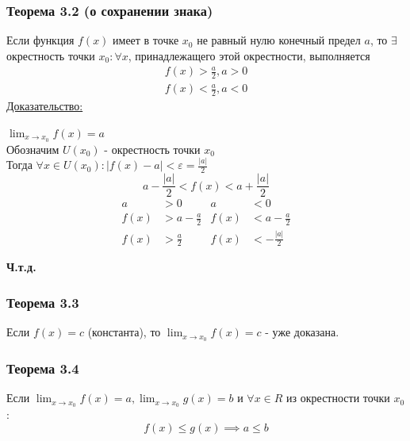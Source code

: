 \documentclass[12pt]{article}
\begin{document}
    \subsubsection*{Теорема 3.2 (о сохранении знака)}
    Если функция $f(x)$ имеет в точке $x_0$ не равный нулю конечный предел $a$, то $\exists$ окрестность точки $x_0 : \forall x$, принадлежащего этой окрестности, выполняется
    \begin{gather*}
        f(x) > \frac{a}{2}, a > 0\\
        f(x) < \frac{a}{2}, a < 0
    \end{gather*}
    \underline{Доказательство:}
    \begin{adjustwidth}{1.5em}{1.5em}
        $\lim_{x\to x_0}f(x) = a$\\
        Обозначим $U(x_0)$ - окрестность точки $x_0$\\
        Тогда $\forall x \in U(x_0) : |f(x) - a| < \varepsilon = \frac{|a|}{2}$
        \[a - \frac{|a|}{2} < f(x) < a + \frac{|a|}{2}\]
        \begin{align*}
            a &> 0 & a &< 0\\
            f(x) &> a - \frac{a}{2} & f(x) &< a - \frac{a}{2}\\
            f(x) &> \frac{a}{2} & f(x) &< -\frac{|a|}{2}
        \end{align*}
        \begin{center}
            \textbf{Ч.т.д.}
        \end{center}
    \end{adjustwidth}

    \subsubsection*{Теорема 3.3}
    Если $f(x) = c$ (константа), то $\lim_{x\to x_0}f(x) = c$ - уже доказана.
    
    \subsubsection*{Теорема 3.4}
    Если $\lim_{x\to x_0}f(x) = a, \lim_{x \to x_0}g(x) = b$ и $\forall x \in R$ из окрестности точки $x_0$:
    \[ f(x) \le g(x) \implies a \le b \]
    
\end{document}
